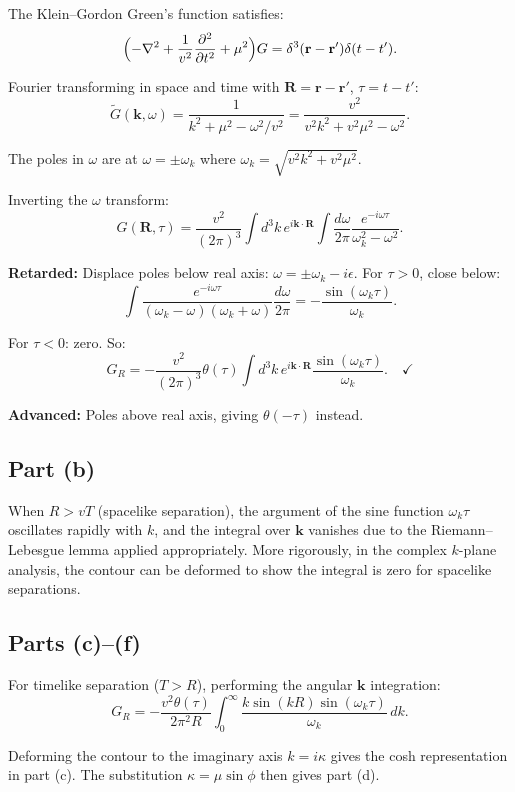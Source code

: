 \documentclass[12pt]{article}
\begin{document}
The Klein--Gordon Green's function satisfies:
\[
\Bigl(-\nabla^2 + \frac{1}{v^2}\frac{\partial^2}{\partial t^2} + \mu^2\Bigr)G = \delta^3(\mathbf{r}-\mathbf{r}')\delta(t-t').
\]

Fourier transforming in space and time with $\mathbf{R} = \mathbf{r}-\mathbf{r}'$, $\tau = t-t'$:
\[
\tilde{G}(\mathbf{k},\omega) = \frac{1}{k^2 + \mu^2 - \omega^2/v^2} = \frac{v^2}{v^2k^2 + v^2\mu^2 - \omega^2}.
\]

The poles in $\omega$ are at $\omega = \pm\omega_k$ where $\omega_k = \sqrt{v^2k^2 + v^2\mu^2}$.

Inverting the $\omega$ transform:
\[
G(\mathbf{R},\tau) = \frac{v^2}{(2\pi)^3}\int d^3k\,e^{i\mathbf{k}\cdot\mathbf{R}}\int\frac{d\omega}{2\pi}\frac{e^{-i\omega\tau}}{\omega_k^2 - \omega^2}.
\]

\textbf{Retarded:} Displace poles below real axis: $\omega = \pm\omega_k - i\epsilon$. For $\tau > 0$, close below:
\[
\int\frac{e^{-i\omega\tau}}{(\omega_k-\omega)(\omega_k+\omega)}\frac{d\omega}{2\pi} = -\frac{\sin(\omega_k\tau)}{\omega_k}.
\]

For $\tau < 0$: zero. So:
\[
G_R = -\frac{v^2}{(2\pi)^3}\theta(\tau)\int d^3k\,e^{i\mathbf{k}\cdot\mathbf{R}}\frac{\sin(\omega_k\tau)}{\omega_k}. \quad \checkmark
\]

\textbf{Advanced:} Poles above real axis, giving $\theta(-\tau)$ instead.

\subsection*{Part (b)}

When $R > vT$ (spacelike separation), the argument of the sine function $\omega_k\tau$ oscillates rapidly with $k$, and the integral over $\mathbf{k}$ vanishes due to the Riemann--Lebesgue lemma applied appropriately. More rigorously, in the complex $k$-plane analysis, the contour can be deformed to show the integral is zero for spacelike separations.

\subsection*{Parts (c)--(f)}

For timelike separation ($T > R$), performing the angular $\mathbf{k}$ integration:
\[
G_R = -\frac{v^2\theta(\tau)}{2\pi^2 R}\int_0^{\infty}\frac{k\sin(kR)\sin(\omega_k\tau)}{\omega_k}\,dk.
\]

Deforming the contour to the imaginary axis $k = i\kappa$ gives the cosh representation in part (c). The substitution $\kappa = \mu\sin\phi$ then gives part (d).
\end{document}
